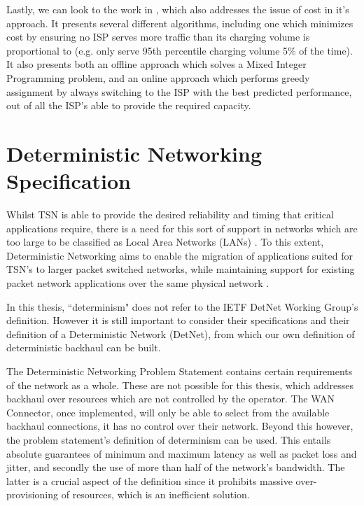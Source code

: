 Lastly, we can look to the work in \cite{goldenberg2004optimizing}, which also addresses the issue of cost in it's approach. It presents several different algorithms, including one which minimizes cost by ensuring no ISP serves more traffic than its charging volume is proportional to (e.g. only serve 95th percentile charging volume 5\% of the time). It also presents both an offline approach which solves a Mixed Integer Programming problem, and an online approach which performs greedy assignment by always switching to the ISP with the best predicted performance, out of all the ISP's able to provide the required capacity.


\section{Deterministic Networking Specification}

Whilst TSN is able to provide the desired reliability and timing that critical applications require, there is a need for this sort of support in networks which are too large to be classified as Local Area Networks (LANs) \cite{detnet-use-cases, detnet-problem-statement}. To this extent, Deterministic Networking aims to enable the migration of applications suited for TSN's to larger packet switched networks, while maintaining support for existing packet network applications over the same physical network \cite{detnet-problem-statement}.

In this thesis, “determinism" does not refer to the IETF DetNet Working Group's definition. However it is still important to consider their specifications and their definition of a Deterministic Network (DetNet), from which our own definition of deterministic backhaul can be built.

The Deterministic Networking Problem Statement contains certain requirements of the network as a whole. These are not possible for this thesis, which addresses backhaul over resources which are not controlled by the operator. The WAN Connector, once implemented, will only be able to select from the available backhaul connections, it has no control over their network. Beyond this however, the problem statement's definition of determinism can be used. This entails absolute guarantees of minimum and maximum latency as well as packet loss and jitter, and secondly the use of more than half of the network's bandwidth. The latter is a crucial aspect of the definition since it prohibits massive over-provisioning of resources, which is an inefficient solution.

